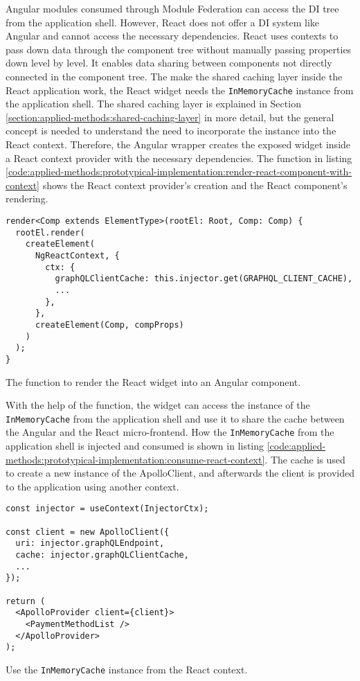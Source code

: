 \noindent Angular modules consumed through Module Federation can access the \ac{DI} tree from the application shell. However, React does not offer a \ac{DI} system like Angular and cannot access the necessary dependencies. React uses contexts to pass down data through the component tree without manually passing properties down level by level. It enables data sharing between components not directly connected in the component tree. The make the shared caching layer inside the React application work, the React widget needs the \texttt{InMemoryCache} instance from the application shell. The shared caching layer is explained in Section \ref{section:applied-methods:shared-caching-layer} in more detail, but the general concept is needed to understand the need to incorporate the instance into the React context. Therefore, the Angular wrapper creates the exposed widget inside a React context provider with the necessary dependencies. The function in listing \ref{code:applied-methods:prototypical-implementation:render-react-component-with-context} shows the React context provider's creation and the React component's rendering. 

\ifshowListings
\begin{listing}[H]
    \begin{verbatim}
render<Comp extends ElementType>(rootEl: Root, Comp: Comp) {
  rootEl.render(
    createElement(
      NgReactContext, {
        ctx: {
          graphQLClientCache: this.injector.get(GRAPHQL_CLIENT_CACHE),
          ...
        },
      },
      createElement(Comp, compProps)
    )
  );
}
    \end{verbatim}
    \caption{The function to render the React widget into an Angular component.}\label{code:applied-methods:prototypical-implementation:render-react-component-with-context}
\end{listing}
\fi

\noindent With the help of the function, the widget can access the instance of the \texttt{InMemoryCache} from the application shell and use it to share the cache between the Angular and the React micro-frontend. How the \texttt{InMemoryCache} from the application shell is injected and consumed is shown in listing \ref{code:applied-methods:prototypical-implementation:consume-react-context}. The cache is used to create a new instance of the ApolloClient, and afterwards the client is provided to the application using another context.

\ifshowListings
\begin{listing}[H]
    \begin{verbatim}
const injector = useContext(InjectorCtx);

const client = new ApolloClient({
  uri: injector.graphQLEndpoint,
  cache: injector.graphQLClientCache,
  ...
});

return (
  <ApolloProvider client={client}>
    <PaymentMethodList />
  </ApolloProvider>
);

    \end{verbatim}
    \caption{Use the \texttt{InMemoryCache} instance from the React context.}\label{code:applied-methods:prototypical-implementation:consume-react-context}
\end{listing}
\fi

